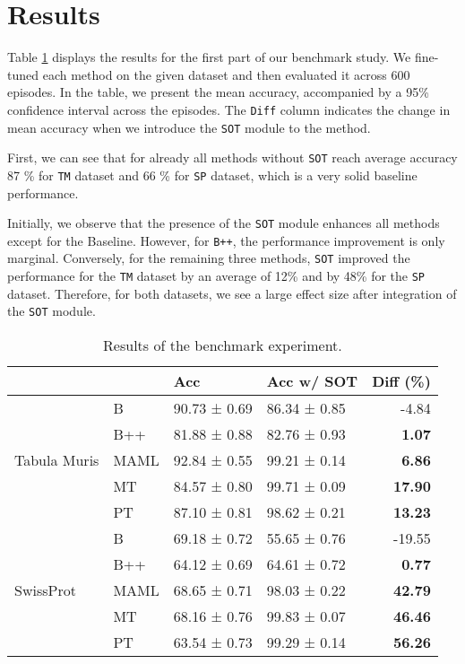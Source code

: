 \section{Results}
Table \ref{tab:tuned-benchmark} displays the results for the first part of our benchmark study. 
We fine-tuned each method on the given dataset and then evaluated it across 600 episodes. 
In the table, we present the mean accuracy, accompanied by a 95\% confidence interval across the episodes. 
The \texttt{Diff} column indicates the change in mean accuracy when we introduce the \texttt{SOT} module to the method.

First, we can see that for already all methods without \texttt{SOT} reach average accuracy 87 \% 
for \texttt{TM} dataset and 66 \% for \texttt{SP} dataset, which is a very solid baseline performance. 


Initially, we observe that the presence of the \texttt{SOT} module enhances all methods except for the Baseline. 
However, for \texttt{B++}, the performance improvement is only marginal. Conversely, for the remaining three methods, 
\texttt{SOT} improved the performance for the \texttt{TM} dataset by an average of 12\% and by 48\% for the \texttt{SP} dataset. 
Therefore, for both datasets, we see a large effect size after integration of the \texttt{SOT} module.

\begin{table}[!ht]
\caption{Results of the benchmark experiment.}
\label{tab:tuned-benchmark}
\centering
\begin{tabular}{llllr}
\toprule
 &  & Acc & Acc w/ SOT & Diff (\%) \\
\midrule
\multirow[c]{5}{*}{Tabula Muris} & B & 90.73 ± 0.69 & 86.34 ± 0.85 & -4.84 \\
 & B++ & 81.88 ± 0.88 & 82.76 ± 0.93 & \bfseries 1.07 \\
 & MAML & 92.84 ± 0.55 & 99.21 ± 0.14 & \bfseries 6.86 \\
 & MT & 84.57 ± 0.80 & 99.71 ± 0.09 & \bfseries 17.90 \\
 & PT & 87.10 ± 0.81 & 98.62 ± 0.21 & \bfseries 13.23 \\
\midrule
\multirow[c]{5}{*}{SwissProt} & B & 69.18 ± 0.72 & 55.65 ± 0.76 & -19.55 \\
 & B++ & 64.12 ± 0.69 & 64.61 ± 0.72 & \bfseries 0.77 \\
 & MAML & 68.65 ± 0.71 & 98.03 ± 0.22 & \bfseries 42.79 \\
 & MT & 68.16 ± 0.76 & 99.83 ± 0.07 & \bfseries 46.46 \\
 & PT & 63.54 ± 0.73 & 99.29 ± 0.14 & \bfseries 56.26 \\
\bottomrule
\end{tabular}
\end{table}